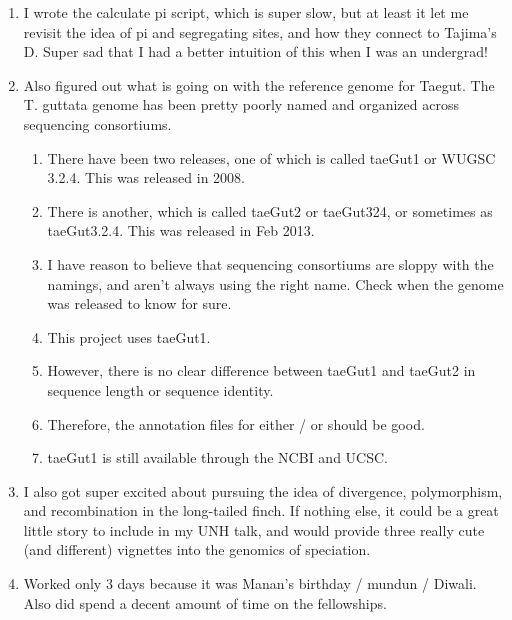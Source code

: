 \documentclass[idxtotoc,hyperref,openany,oneside]{labbook} %
\begin{document}
\begin{enumerate}
\begin{enumerate}
\end{enumerate}
\item I wrote the calculate pi script, which is super slow, but at least it let me revisit the idea of pi and segregating sites, and how they connect to Tajima's D. Super sad that I had a better intuition of this when I was an undergrad!
\item Also figured out what is going on with the reference genome for Taegut. The T. guttata genome has been pretty poorly named and organized across sequencing consortiums.
\begin{enumerate}
\item There have been two releases, one of which is called taeGut1 or WUGSC 3.2.4. This was released in 2008.
\item There is another, which is called taeGut2 or taeGut324, or sometimes as taeGut3.2.4. This was released in Feb 2013.
\item I have reason to believe that sequencing consortiums are sloppy with the namings, and aren't always using the right name. Check when the genome was released to know for sure.
\item This project uses taeGut1.
\item However, there is no clear difference between taeGut1 and taeGut2 in sequence length or sequence identity.
\item Therefore, the annotation files for either / or should be good.
\item taeGut1 is still available through the NCBI and UCSC.
\end{enumerate}
\item I also got super excited about pursuing the idea of divergence, polymorphism, and recombination in the long-tailed finch. If nothing else, it could be a great little story to include in my UNH talk, and would provide three really cute (and different) vignettes into the genomics of speciation.
\item Worked only 3 days because it was Manan's birthday / mundun / Diwali. Also did spend a decent amount of time on the fellowships.
\end{enumerate}
\end{document}
